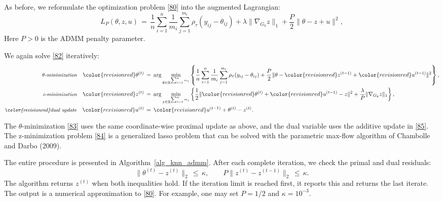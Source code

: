 \documentclass[twoside,11pt]{article}
\newcommand{\rev}[1]{{\color{revisionred}#1}}
\newenvironment{revision}{\color{revisionred}}{}
\begin{document}
As before, we  reformulate the optimization problem \eqref{80} into the augmented Lagrangian:
\begin{equation}
\label{82}
L_P(\theta, z, u) \,=\, \frac{1}{n} \sum_{i=1}^{n} \frac{1}{m_i} \sum_{j=1}^{m_i} \rho_\tau (y_{ij} - \theta_{ij}) + \lambda \|\nabla_{G_k} z\|_1 + \frac{P}{2} \| \theta - z + u \|^2,
\end{equation}
\rev{Here \(P>0\) is the ADMM penalty parameter.}

We again solve \eqref{82} iteratively:
\begin{align}
\label{83}
\text{\small \textit{$\theta$-minimization}} \quad \rev{\theta^{(t)}} &\,=\, \arg\min_{\theta \in \mathbb{R}^{\sum_{i=1}^n m_i}} \left\{ \frac{1}{n} \sum_{i=1}^{n} \frac{1}{m_i} \sum_{j=1}^{m_i} \rho_\tau (y_{ij} - \theta_{ij}) + \frac{P}{2} \| \theta - \rev{z^{(t-1)}} + \rev{u^{(t-1)}} \|^2 \right\}, \\
\label{84}
\text{\small \textit{z-minimization}} \quad \rev{z^{(t)}} &\,=\, \arg\min_{z \in \mathbb{R}^{\sum_{i=1}^n m_i}} \left\{ \frac{1}{2} \| \rev{\theta^{(t)}} + \rev{u^{(t-1)}} - z \|^2 + \frac{\lambda}{P} \|\nabla_{G_k} z\|_1 \right\}, \\
\label{85}
\text{\small \textit{\rev{dual update}}} \quad \rev{u^{(t)}} &\,=\, \rev{u^{(t-1)}+\theta^{(t)}-z^{(t)}.}
\end{align}

\rev{The $\theta$-minimization \eqref{83} uses the same coordinate-wise proximal update as above, and the dual variable uses the additive update in \eqref{85}. The z-minimization problem \eqref{84} is a generalized lasso problem that can be solved with the parametric max-flow algorithm of Chambolle and Darbo (2009).}

\begin{revision}
The entire procedure is presented in Algorithm~\ref{alg_knn_admm}.
After each complete iteration, we check the primal and dual residuals:
\begin{equation}
\label{eq:knn_stop}
\|\theta^{(t)}-z^{(t)}\|_2\,\leq\,\kappa,
\qquad
P\|z^{(t)}-z^{(t-1)}\|_2\,\leq\,\kappa.
\end{equation}
The algorithm returns $z^{(t)}$ when both inequalities hold.
If the iteration limit is reached first, it reports this and returns
the last iterate. The output is a numerical approximation to
\eqref{80}. For example, one may set $P=1/2$ and $\kappa=10^{-3}$.
\end{revision}
\end{document}
